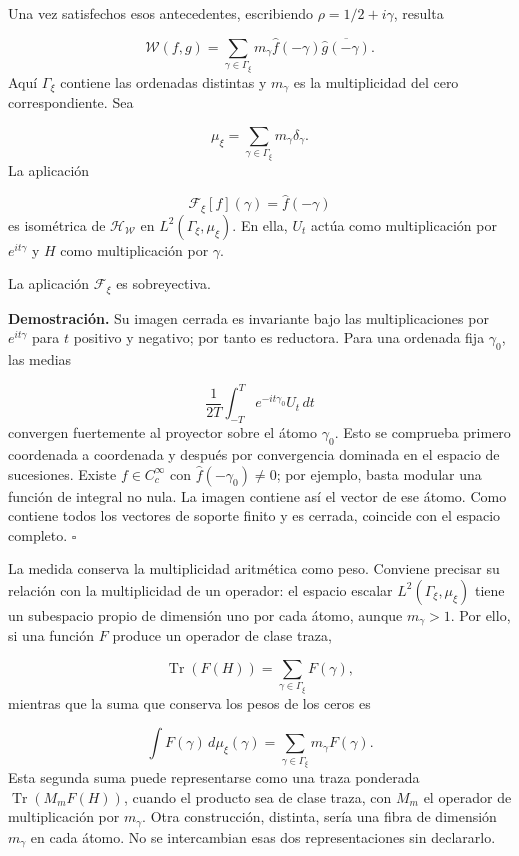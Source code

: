 Una vez satisfechos esos antecedentes, escribiendo \(\rho=1/2+i\gamma\), resulta

\[
\mathscr W(f,g)
=\sum_{\gamma\in\Gamma_\xi}
m_\gamma\widehat f(-\gamma)\overline{\widehat g(-\gamma)}.
\]
Aquí \(\Gamma_\xi\) contiene las ordenadas distintas y \(m_\gamma\) es la multiplicidad del cero correspondiente. Sea

\[
\mu_\xi=\sum_{\gamma\in\Gamma_\xi}m_\gamma\delta_\gamma.
\]
La aplicación

\[
\mathcal F_\xi[f](\gamma)=\widehat f(-\gamma)
\]
es isométrica de \(\mathcal H_{\mathscr W}\) en \(L^2(\Gamma_\xi,\mu_\xi)\). En ella, \(U_t\) actúa como multiplicación por \(e^{it\gamma}\) y \(H\) como multiplicación por \(\gamma\).

La aplicación \(\mathcal F_\xi\) es sobreyectiva.

\textbf{Demostración.} Su imagen cerrada es invariante bajo las multiplicaciones por \(e^{it\gamma}\) para \(t\) positivo y negativo; por tanto es reductora. Para una ordenada fija \(\gamma_0\), las medias

\[
\frac1{2T}\int_{-T}^T e^{-it\gamma_0}U_t\,dt
\]
convergen fuertemente al proyector sobre el átomo \(\gamma_0\). Esto se comprueba primero coordenada a coordenada y después por convergencia dominada en el espacio de sucesiones. Existe \(f\in C_c^\infty\) con \(\widehat f(-\gamma_0)\neq0\); por ejemplo, basta modular una función de integral no nula. La imagen contiene así el vector de ese átomo. Como contiene todos los vectores de soporte finito y es cerrada, coincide con el espacio completo. \hfill\(\square\)

La medida conserva la multiplicidad aritmética como peso. Conviene precisar su relación con la multiplicidad de un operador: el espacio escalar \(L^2(\Gamma_\xi,\mu_\xi)\) tiene un subespacio propio de dimensión uno por cada átomo, aunque \(m_\gamma>1\). Por ello, si una función \(F\) produce un operador de clase traza,

\[
\operatorname{Tr}(F(H))=\sum_{\gamma\in\Gamma_\xi}F(\gamma),
\]
mientras que la suma que conserva los pesos de los ceros es

\[
\int F(\gamma)\,d\mu_\xi(\gamma)
=\sum_{\gamma\in\Gamma_\xi}m_\gamma F(\gamma).
\]
Esta segunda suma puede representarse como una traza ponderada \(\operatorname{Tr}(M_mF(H))\), cuando el producto sea de clase traza, con \(M_m\) el operador de multiplicación por \(m_\gamma\). Otra construcción, distinta, sería una fibra de dimensión \(m_\gamma\) en cada átomo. No se intercambian esas dos representaciones sin declararlo.

